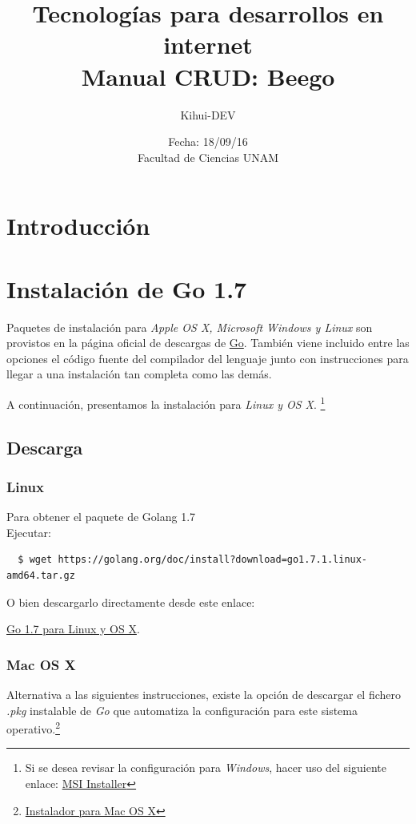 \documentclass[12pt]{article}
\title{Tecnologías para desarrollos en internet \\ Manual CRUD: Beego}
\author{Kihui-DEV}
\date{Fecha: 18/09/16 \\ Facultad de Ciencias UNAM}
\begin{document}
\maketitle
\tableofcontents{}
\newpage

\section{Introducción}
\section{Instalación de Go 1.7}
Paquetes de instalación para \textit{Apple OS X, Microsoft Windows y Linux} son provistos en la página oficial de descargas de \href{https://golang.org/dl/}{Go}. También viene incluido entre las opciones el código fuente del compilador del lenguaje junto con instrucciones para llegar a una instalación tan completa como las demás. \par
A continuación, presentamos la instalación para \textit{Linux y OS X}. \footnote{Si se desea revisar la configuración para \textit{Windows}, hacer uso del siguiente enlace:
  \href{https://golang.org/doc/install?download=go1.7.1.windows-amd64.msi}{MSI Installer}}

\subsection{Descarga}\label{sec:d}


\subsubsection*{Linux}
Para obtener el paquete de Golang 1.7 \\
Ejecutar:
\begin{verbatim}
  $ wget https://golang.org/doc/install?download=go1.7.1.linux-amd64.tar.gz
\end{verbatim}
O bien descargarlo directamente desde este enlace:
\begin{center}
\href{https://golang.org/doc/install?download=go1.7.1.linux-amd64.tar.gz}{Go 1.7 para Linux y OS X}.
\end{center}


\subsubsection*{Mac OS X}
Alternativa a las siguientes instrucciones, existe la opción de descargar el fichero \textit{.pkg} instalable de \textit{Go} que automatiza la configuración para este sistema operativo.\footnote{\href{https://golang.org/doc/install?download=go1.7.1.darwin-amd64.pkg}{Instalador para Mac OS X}}\\[1mm]
\end{document}
